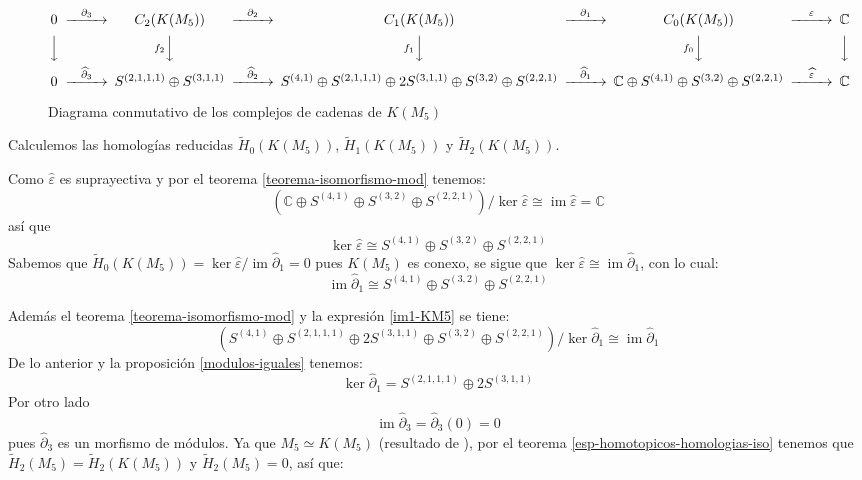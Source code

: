 \documentclass[12pt]{book}
\theoremstyle{definition}
\DeclareMathOperator{\im}{im}
\newcounter{in}
\begin{document}
\begin{sidewaysfigure}%
  {\small
  \[
  \begin{CD}
    0 @>{\partial_{3}}>> C_{2}(K(M_{5})) @>{\partial_{2}}>> C_{1}(K(M_{5})) @>{\partial_{1}}>> C_{0}(K(M_{5})) @>{\varepsilon}>> \mathbb{C}\\
    @VVV   @Vf_{2}VV   @Vf_{1}VV  @Vf_{0}VV  @VVV    \\
    0 @>{\widehat\partial_{3}}>> S^{(2,1,1,1)}\oplus S^{(3,1,1)}
    @>{\widehat\partial_{2}}>> S^{(4,1)}\oplus S^{(2,1,1,1)}\oplus
    2S^{(3,1,1)}\oplus S^{(3,2)} \oplus S^{(2,2,1)}
    @>{\widehat\partial_{1}}>> \mathbb{C}\oplus S^{(4,1)}\oplus
    S^{(3,2)}\oplus S^{(2,2,1)}@>{\widehat \varepsilon}>> \mathbb{C}
  \end{CD}
  \]
   }
  
  \caption{Diagrama conmutativo de los complejos de cadenas de $K(M_{5})$}
  \label{fig:diagrama-conmutativo-clanes5}
\end{sidewaysfigure}

Calculemos las homologías reducidas $\widetilde H_{0}(K(M_{5}))$,
$\widetilde H_{1}(K(M_{5}))$ y $\widetilde H_{2}(K(M_{5}))$.

Como $\widehat\varepsilon$ es suprayectiva y por el teorema \ref{teorema-isomorfismo-mod} tenemos:
\begin{equation*}
  (\mathbb{C}\oplus S^{(4,1)}\oplus S^{(3,2)}\oplus
  S^{(2,2,1)})/\ker\widehat\varepsilon\cong \im \widehat\varepsilon=\mathbb{C}
\end{equation*}
así que
\begin{equation*}
  \label{ker0-KM5}
  \ker\widehat\varepsilon\cong S^{(4,1)} \oplus S^{(3,2)}\oplus S^{(2,2,1)}
\end{equation*}
Sabemos que $\widetilde H_{0}(K(M_{5}))=\ker \widehat\varepsilon/\im
\widehat\partial_{1}=0$ pues $K(M_{5})$ es conexo, se sigue que $\ker \widehat\varepsilon\cong
\im\widehat\partial_{1}$, con lo cual:
\begin{equation}
  \label{im1-KM5}
  \im \widehat\partial_{1}\cong S^{(4,1)} \oplus S^{(3,2)}\oplus S^{(2,2,1)}
\end{equation}

Además el teorema \ref{teorema-isomorfismo-mod} y la expresión \ref{im1-KM5} se tiene:
$$(S^{(4,1)}\oplus S^{(2,1,1,1)}\oplus 2S^{(3,1,1)}\oplus S^{(3,2)}
\oplus S^{(2,2,1)})/\ker \widehat\partial_{1}\cong \im \widehat\partial_{1}$$
De lo anterior y la proposición \ref{modulos-iguales} tenemos:
\begin{equation}
\label{ker1-KM5}
\ker \widehat\partial_{1}=S^{(2,1,1,1)}\oplus 2S^{(3,1,1)}
\end{equation}
Por otro lado
\begin{equation*}
\im\widehat\partial_{3}=\widehat\partial_{3}(0)=0
\label{im3-KM5}
\end{equation*}
pues $\widehat\partial_{3}$ es un morfismo de módulos. Ya que
$M_{5}\simeq K(M_{5})$ (resultado de \cite{larrion2009clique}), por el teorema
\ref{esp-homotopicos-homologias-iso} tenemos que $\widetilde
H_{2}(M_{5})=\widetilde H_{2}(K(M_{5}))$ y  $\widetilde H_{2}(M_{5})=0$, así que:
\end{document}
